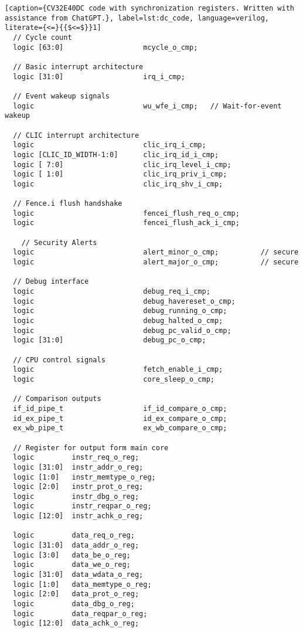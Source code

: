 \begin{lstlisting}[caption={CV32E40DC code with synchronization registers. Written with assistance from ChatGPT.}, label=lst:dc_code, language=verilog, literate={<=}{{$<=$}}1]
  // Cycle count
  logic [63:0]                   mcycle_o_cmp;

  // Basic interrupt architecture
  logic [31:0]                   irq_i_cmp;

  // Event wakeup signals
  logic                          wu_wfe_i_cmp;   // Wait-for-event wakeup

  // CLIC interrupt architecture
  logic                          clic_irq_i_cmp;
  logic [CLIC_ID_WIDTH-1:0]      clic_irq_id_i_cmp;
  logic [ 7:0]                   clic_irq_level_i_cmp;
  logic [ 1:0]                   clic_irq_priv_i_cmp;
  logic                          clic_irq_shv_i_cmp;

  // Fence.i flush handshake
  logic                          fencei_flush_req_o_cmp;
  logic                          fencei_flush_ack_i_cmp;

    // Security Alerts
  logic                          alert_minor_o_cmp;          // secure
  logic                          alert_major_o_cmp;          // secure

  // Debug interface
  logic                          debug_req_i_cmp;
  logic                          debug_havereset_o_cmp;
  logic                          debug_running_o_cmp;
  logic                          debug_halted_o_cmp;
  logic                          debug_pc_valid_o_cmp;
  logic [31:0]                   debug_pc_o_cmp;

  // CPU control signals
  logic                          fetch_enable_i_cmp;
  logic                          core_sleep_o_cmp;

  // Comparison outputs 
  if_id_pipe_t                   if_id_compare_o_cmp;
  id_ex_pipe_t                   id_ex_compare_o_cmp;
  ex_wb_pipe_t                   ex_wb_compare_o_cmp;

  // Register for output form main core
  logic         instr_req_o_reg;         
  logic [31:0]  instr_addr_o_reg;        
  logic [1:0]   instr_memtype_o_reg;     
  logic [2:0]   instr_prot_o_reg;        
  logic         instr_dbg_o_reg;         
  logic         instr_reqpar_o_reg;      
  logic [12:0]  instr_achk_o_reg;        

  logic         data_req_o_reg;          
  logic [31:0]  data_addr_o_reg;         
  logic [3:0]   data_be_o_reg;           
  logic         data_we_o_reg;           
  logic [31:0]  data_wdata_o_reg;        
  logic [1:0]   data_memtype_o_reg;      
  logic [2:0]   data_prot_o_reg;           
  logic         data_dbg_o_reg;          
  logic         data_reqpar_o_reg;       
  logic [12:0]  data_achk_o_reg;       


\end{lstlisting}
